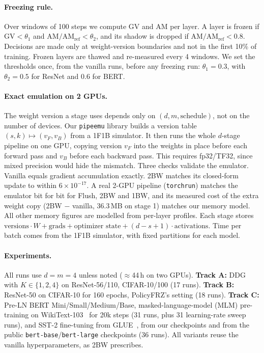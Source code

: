 \documentclass[10pt,twocolumn]{article}
\begin{document}
\paragraph{Freezing rule.} Over windows of 100 steps we compute GV and AM per layer. A layer is
frozen if $\text{GV}{<}\theta_1$ and $\text{AM}/\text{AM}_\text{ref}{<}\theta_2$, and its
shadow is dropped if $\text{AM}/\text{AM}_\text{ref}{<}0.8$. Decisions are made only at
weight-version boundaries and not in the first 10\% of training. Frozen layers are thawed and
re-measured every 4 windows. We set the thresholds once, from the vanilla runs, before any
freezing run: $\theta_1{=}0.3$, with $\theta_2{=}0.5$ for ResNet and $0.6$ for BERT.

\paragraph{Exact emulation on 2 GPUs.} The weight version a stage uses depends only on
$(d, m, \text{schedule})$, not on the number of devices. Our \texttt{pipeemu} library builds a
version table $(s,k)\mapsto(v_F,v_B)$ from a 1F1B simulator. It then runs the whole
$d$-stage pipeline on one GPU, copying version $v_F$ into the weights in place before each
forward pass and $v_B$ before each backward pass. This requires fp32/TF32, since mixed
precision would hide the mismatch. Three checks validate the emulator. Vanilla equals
gradient accumulation exactly. 2BW matches its closed-form update to within
$6\times10^{-17}$. A real 2-GPU pipeline (\texttt{torchrun}) matches the emulator bit for bit
for Flush, 2BW and 1BW, and its measured cost of the extra weight copy (2BW $-$ vanilla,
36.3\,MB on stage 1) matches our memory model.
All other memory figures are modelled from per-layer profiles. Each stage stores
$\text{versions}\cdot W + \text{grads} + \text{optimizer state} + (d{-}s{+}1)\cdot\text{activations}$.
Time per batch comes from the 1F1B simulator, with fixed partitions for each model.

\paragraph{Experiments.} All runs use $d{=}m{=}4$ unless noted ($\approx$44\,h on two GPUs).
\textbf{Track A:} DDG with $K\in\{1,2,4\}$ on ResNet-56/110, CIFAR-10/100 (17 runs).
\textbf{Track B:} ResNet-50 on CIFAR-10 for 160 epochs, PolicyFRZ's setting (18 runs).
\textbf{Track C:} Pre-LN BERT Mini/Small/Medium/Base, masked-language-model (MLM)
pre-training on WikiText-103~\cite{wikitext} for 20k steps (31 runs, plus 31 learning-rate sweep
runs), and SST-2 fine-tuning from GLUE~\cite{glue}, from our checkpoints and from the public
\texttt{bert-base}/\texttt{bert-large} checkpoints (36 runs).
All variants reuse the vanilla hyperparameters, as 2BW prescribes.
\end{document}
